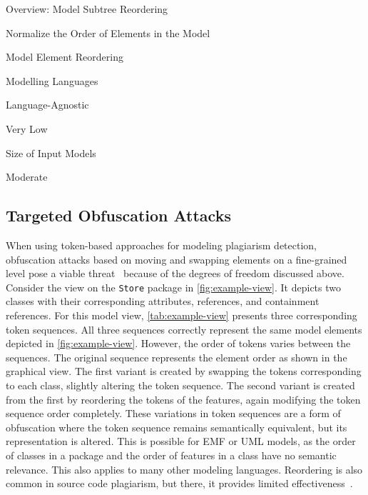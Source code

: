 \begin{factsheet}{Overview: Model Subtree Reordering} 
    \begin{description}[style=multiline,leftmargin=5.5cm]
        \item[Core Principle] Normalize the Order of Elements in the Model
        \item[Targeted Obfuscation Attack] Model Element Reordering
        \item[Language Family] Modelling Languages
        \item[Language Dependence] Language-Agnostic
        \item[Performance Impact] Very Low
        \item[Main Scalability Determinant] Size of Input Models
        \item[Integration Complexity] Moderate
    \end{description}
\end{factsheet}

\subsection{Targeted Obfuscation Attacks}
When using token-based approaches for modeling plagiarism detection, obfuscation attacks based on moving and swapping elements on a fine-grained level pose a viable threat~\cite{Saglam2022} because of the degrees of freedom discussed above.
Consider the view on the \texttt{Store} package in \autoref{fig:example-view}. It depicts two classes with their corresponding attributes, references, and containment references.
For this model view, \autoref{tab:example-view} presents three corresponding token sequences. All three sequences correctly represent the same model elements depicted in \autoref{fig:example-view}. However, the order of tokens varies between the sequences.
The original sequence represents the element order as shown in the graphical view. The first variant is created by swapping the tokens corresponding to each class, slightly altering the token sequence. The second variant is created from the first by reordering the tokens of the features, again modifying the token sequence order completely.
%
These variations in token sequences are a form of obfuscation where the token sequence remains semantically equivalent, but its representation is altered. This is possible for \ac{EMF} or \ac{UML} models, as the order of classes in a package and the order of features in a class have no semantic relevance. This also applies to many other modeling languages. Reordering is also common in source code plagiarism, but there, it provides limited effectiveness~\cite{Saglam2024b}.

